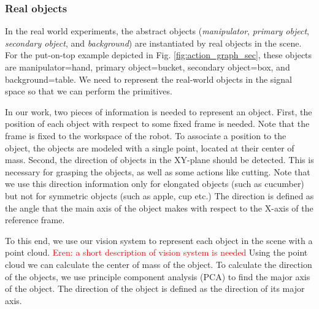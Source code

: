 \subsubsection{Real objects}
In the real world experiments, the abstract objects (\textit{manipulator}, \textit{primary object}, \textit{secondary object}, and \textit{background})
are instantiated by real objects in the scene.
For the put-on-top example depicted in Fig. \ref{fig:action_graph_sec},
these objects are manipulator=hand, primary object=bucket, secondary object=box, and background=table.
We need to represent the real-world objects in the signal space so that we can perform the primitives.

In our work, two pieces of information is needed to represent an object.
First, the position of each object with respect to some fixed frame is needed.
Note that the frame is fixed to the workspace of the robot.
To associate a position to the object, the objects are modeled with a single point, located at their center of mass.
Second, the direction of objects in the XY-plane should be detected.
This is necessary for grasping the objects, as well as some actions like cutting.
Note that we use this direction information only for elongated objects (such as cucumber) but not for symmetric objects (such as apple, cup etc.)
The direction is defined as the angle that the main axis of the object makes with respect to the X-axis of the reference frame.

To this end, we use our vision system to represent each object in the scene with a point cloud.
\textcolor{red}{Eren: a short description of vision system is needed}
Using the point cloud we can calculate the center of mass of the object.
To calculate the direction of the objects, we use principle component analysis (PCA) to find the major axis of the object.
The direction of the object is defined as the direction of its major axis.

